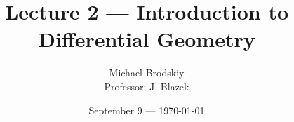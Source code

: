 


\title{Lecture 2 — Introduction to Differential Geometry}
\date{September 9 — \today}
\author{Michael Brodskiy\\ \small Professor: J. Blazek}



\maketitle

